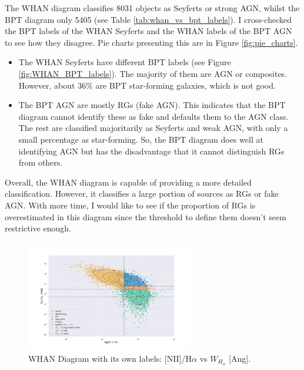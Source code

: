 \documentclass[letterpaper, oneside]{article}
\begin{document}
	The WHAN diagram classifies 8031 objects as Seyferts or strong AGN, whilst the BPT diagram only 5405 (see Table \ref{tab:whan_vs_bpt_labels}). I cross-checked the BPT labels of the WHAN Seyferts and the WHAN labels of the BPT AGN to see how they disagree. Pie charts presenting this are in Figure \ref{fig:pie_charts}.
	\begin{itemize}
		\item The WHAN Seyferts have different BPT labels (see Figure \ref{fig:WHAN_BPT_labels}). The majority of them are AGN or composites. However, about 36\% are BPT star-forming galaxies, which is not good.
		
		\item The BPT AGN are mostly RGs (fake AGN). This indicates that the BPT diagram cannot identify these as fake and defaults them to the AGN class. The rest are classified majoritarily as Seyferts and weak AGN, with only a small percentage as star-forming. So, the BPT diagram does well at identifying AGN but has the disadvantage that it cannot distinguish RGs from others.
	\end{itemize}

	Overall, the WHAN diagram is capable of providing a more detailed classification. However, it classifies a large portion of sources as RGs or fake AGN. With more time, I would like to see if the proportion of RGs is overestimated in this diagram since the threshold to define them doesn't seem restrictive enough.
	
	\begin{figure}[H]
		\centering
		\includegraphics[width=0.65\textwidth]{../WHAN_diagrams/WHAN_diagram_whan_label.pdf}
		\caption{WHAN Diagram with its own labels: [NII]/H$\alpha$ vs $W_{H_{\alpha}}$ [Ang].}
		\label{fig:WHAN_whan_labels}
	\end{figure}
\end{document}
